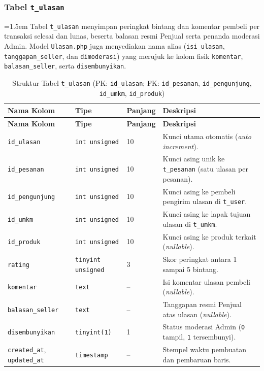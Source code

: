 \subsubsection{Tabel \texttt{t\_ulasan}}
{\emergencystretch=1.5em
Tabel \texttt{t\_ulasan} menyimpan peringkat bintang dan komentar pembeli per transaksi selesai dan lunas, beserta balasan resmi Penjual serta penanda moderasi Admin. Model \texttt{Ulasan.php} juga menyediakan nama alias (\texttt{isi\_ulasan}, \texttt{tanggapan\_seller}, dan \texttt{dimoderasi}) yang merujuk ke kolom fisik \texttt{komentar}, \texttt{balasan\_seller}, serta \texttt{disembunyikan}.\par}

\renewcommand{\arraystretch}{1.20}
\begin{longtable}{|L{3.85cm}|L{2.4cm}|C{1.65cm}|L{\dimexpr\textwidth-3.85cm-2.4cm-1.65cm-8\arrayrulewidth\relax}|}
\caption{Struktur Tabel \texttt{t\_ulasan} (PK: \texttt{id\_ulasan}; FK: \texttt{id\_pesanan}, \texttt{id\_pengunjung}, \texttt{id\_umkm}, \texttt{id\_produk})}
\label{tab:skema-ulasan} \\
\hline
{}
\textbf{Nama Kolom} & \textbf{Tipe} & \textbf{Panjang} & \textbf{Deskripsi} \\
\hline
\endfirsthead
\hline
{}
\textbf{Nama Kolom} & \textbf{Tipe} & \textbf{Panjang} & \textbf{Deskripsi} \\
\hline
\endhead
\hline
\endfoot
\texttt{id\_ulasan} & \texttt{int unsigned} & 10 & Kunci utama otomatis (\textit{auto increment}). \\
\hline
\texttt{id\_pesanan} & \texttt{int unsigned} & 10 & Kunci asing unik ke \texttt{t\_pesanan} (satu ulasan per pesanan). \\
\hline
\texttt{id\_pengunjung} & \texttt{int unsigned} & 10 & Kunci asing ke pembeli pengirim ulasan di \texttt{t\_user}. \\
\hline
\texttt{id\_umkm} & \texttt{int unsigned} & 10 & Kunci asing ke lapak tujuan ulasan di \texttt{t\_umkm}. \\
\hline
\texttt{id\_produk} & \texttt{int unsigned} & 10 & Kunci asing ke produk terkait (\textit{nullable}). \\
\hline
\texttt{rating} & \texttt{tinyint unsigned} & 3 & Skor peringkat antara 1 sampai 5 bintang. \\
\hline
\texttt{komentar} & \texttt{text} & -- & Isi komentar ulasan pembeli (\textit{nullable}). \\
\hline
\texttt{balasan\_seller} & \texttt{text} & -- & Tanggapan resmi Penjual atas ulasan (\textit{nullable}). \\
\hline
\texttt{disembunyikan} & \texttt{tinyint(1)} & 1 & Status moderasi Admin (\texttt{0} tampil, \texttt{1} tersembunyi). \\
\hline
\texttt{created\_at}, \texttt{updated\_at} & \texttt{timestamp} & -- & Stempel waktu pembuatan dan pembaruan baris. \\
\hline
\end{longtable}

